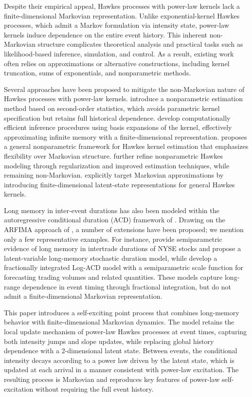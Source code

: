 \documentclass[11pt]{article}
\theoremstyle{definition}
\begin{document}
Despite their empirical appeal, Hawkes processes with power-law kernels lack a finite-dimensional Markovian representation.
Unlike exponential-kernel Hawkes processes, which admit a Markov formulation via intensity state, power-law kernels induce dependence on the entire event history.
This inherent non-Markovian structure complicates theoretical analysis and practical tasks such as likelihood-based inference, simulation, and control.
As a result, existing work often relies on approximations or alternative constructions, including kernel truncation, sums of exponentials, and nonparametric methods.

Several approaches have been proposed to mitigate the non-Markovian nature of Hawkes processes with power-law kernels. 
\cite{bacry2011nonparametric} introduce a nonparametric estimation method based on second-order statistics, which avoids parametric kernel specification but retains full historical dependence. 
\cite{zhang2022efficient} develop computationally efficient inference procedures using basis expansions of the kernel, effectively approximating infinite memory with a finite-dimensional representation. 
\cite{Zhuang2020NonparametricFramework} proposes a general nonparametric framework for Hawkes kernel estimation that emphasizes flexibility over Markovian structure. 
\cite{bonnet2025nonparametric} further refine nonparametric Hawkes modeling through regularization and improved estimation techniques, while remaining non-Markovian. 
\cite{khabou2025markov} explicitly target Markovian approximations by introducing finite-dimensional latent-state representations for general Hawkes kernels.

Long memory in inter-event durations has also been modeled within the autoregressive conditional duration (ACD) framework of \cite{EngleRussell1998}. 
Drawing on the ARFIMA approach of \cite{granger1980longmemory}, a number of extensions have been proposed; we mention only a few representative examples. 
For instance, \cite{deo2010longmemory} provide semiparametric evidence of long memory in intertrade durations of NYSE stocks and propose a latent-variable long-memory stochastic duration model, 
while \cite{feng2015forecasting} develop a fractionally integrated Log-ACD model with a semiparametric scale function for forecasting trading volumes and related quantities. 
These models capture long-range dependence in event timing through fractional integration, but do not admit a finite-dimensional Markovian representation.

This paper introduces a self-exciting point process that combines long-memory behavior with finite-dimensional Markovian dynamics.
The model retains the local update mechanism of power-law Hawkes processes at event times, capturing both intensity jumps and slope updates, while replacing global history dependence with a 2-dimensional latent state.
Between events, the conditional intensity decays according to a power law driven by the latent state, which is updated at each arrival in a manner consistent with power-law excitation.
The resulting process is Markovian and reproduces key features of power-law self-excitation without requiring the full event history.
\end{document}
